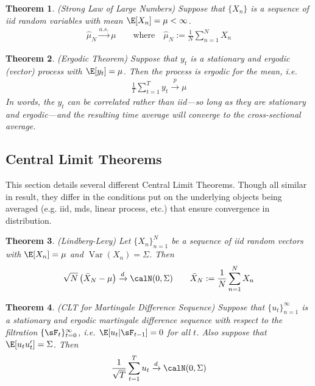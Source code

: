 \documentclass[12pt]{article}
\theoremstyle{plain}
\newtheorem{thm}{Theorem}[section]
\theoremstyle{definition}
\theoremstyle{remark}
\newcommand{\Var}{\operatorname{Var}}
\newcommand{\asto}{\xrightarrow{a.s.}}
\newcommand{\pto}{\xrightarrow{p}}
\newcommand{\dto}{\xrightarrow{d}}
\newcommand{\sumnN}{\sum^N_{n=1}}
\newcommand{\sumtT}{\sum^T_{t=1}}
\newcommand{\ninf}{_{n=1}^\infty}
\newcommand{\nN}{_{n=1}^N}
\newcommand{\tinfz}{_{t=0}^\infty}
\begin{document}
\begin{thm}\emph{(Strong Law of Large Numbers)}
Suppose that $\{X_n\}$ is a sequence of iid random variables with mean
$\E[X_n]=\mu<\infty$.
\begin{align*}
  \hat{\mu}_N \asto \mu
  \qquad\text{where} \quad
  \hat{\mu}_N := \frac{1}{N} \sumnN X_n
\end{align*}
\end{thm}

\begin{thm}\emph{(Ergodic Theorem)}
\label{thm:ergodic}
Suppose that $y_t$ is a stationary and ergodic (vector) process with
$\E[y_t]=\mu$. Then the process is ergodic for the mean, i.e.
\begin{align*}
  \frac{1}{T}\sumtT y_t \pto \mu
\end{align*}
In words, the $y_t$ can be correlated rather than iid---so long as they
are stationary and ergodic---and the resulting time average will
converge to the cross-sectional average.
\end{thm}


\clearpage
\subsection{Central Limit Theorems}

This section details several different Central Limit Theorems.
Though all similar in result, they differ in the conditions put on
the underlying objects being averaged (e.g. iid, mds, linear process,
etc.) that ensure convergence in distribution.


\begin{thm}\emph{(Lindberg-Levy)}
\label{thm:cltlindberglevy}
Let $\{X_n\}\nN$ be a sequence of iid random vectors with
$\E[X_n] = \mu$ and $\Var(X_n)=\Sigma$. Then
\begin{align*}
  \sqrt{N}
  \left(\bar{X}_N - \mu\right) \dto \calN(0,\Sigma)
  \qquad
  \bar{X}_N := \frac{1}{N}\sumnN X_n
\end{align*}
\end{thm}

\begin{thm}\emph{(CLT for Martingale Difference Sequence)}
Suppose that $\{u_t\}\ninf$ is a stationary and ergodic martingale
difference sequence with respect to the filtration
$\{\sF_t\}\tinfz$, i.e. $\E[u_t|\sF_{t-1}]=0$ for all $t$.
Also suppose that $\E[u_tu_t']=\Sigma$. Then
\begin{align*}
  \frac{1}{\sqrt{T}}\sumtT u_t \dto \calN(0,\Sigma)
\end{align*}
\end{thm}
\end{document}
